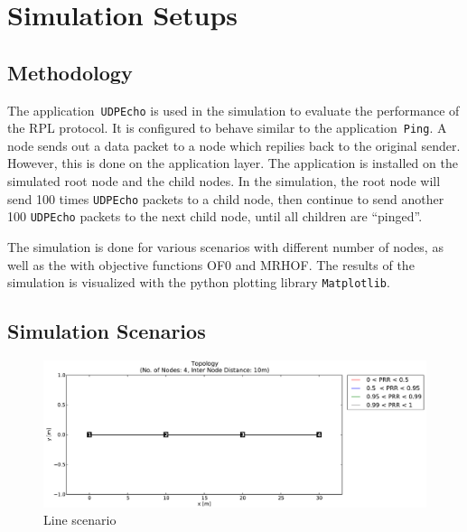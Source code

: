 \section{Simulation Setups}
\label{Sim:Setup}
\subsection{Methodology}
\label{Sim:Method}
The application~\texttt{UDPEcho} is used in the simulation to evaluate the performance of the RPL protocol. It is configured to behave similar to the application~\texttt{Ping}. A node sends out a data packet to a node which repilies back to the original sender. However, this is done on the application layer. The application is installed on the simulated root node and the child nodes. In the simulation, the root node will send 100 times \texttt{UDPEcho} packets to a child node, then continue to send another 100 \texttt{UDPEcho} packets to the next child node, until all children are  ``pinged''.     
\newline

The simulation is done for various scenarios with different number of nodes, as well as the with objective functions OF0 and MRHOF. The results of the simulation is visualized with the python plotting library \texttt{Matplotlib}.

\subsection{Simulation Scenarios}
\label{Sim:Scenarios}
\begin{figure}[!ht]
 	\centering
    \leavevmode
      \includegraphics[scale=0.35]{Pics/results/topo4_dist10_line.pdf}
    \caption{Line scenario}
    \label{fig:scenario_line}
\end{figure}


